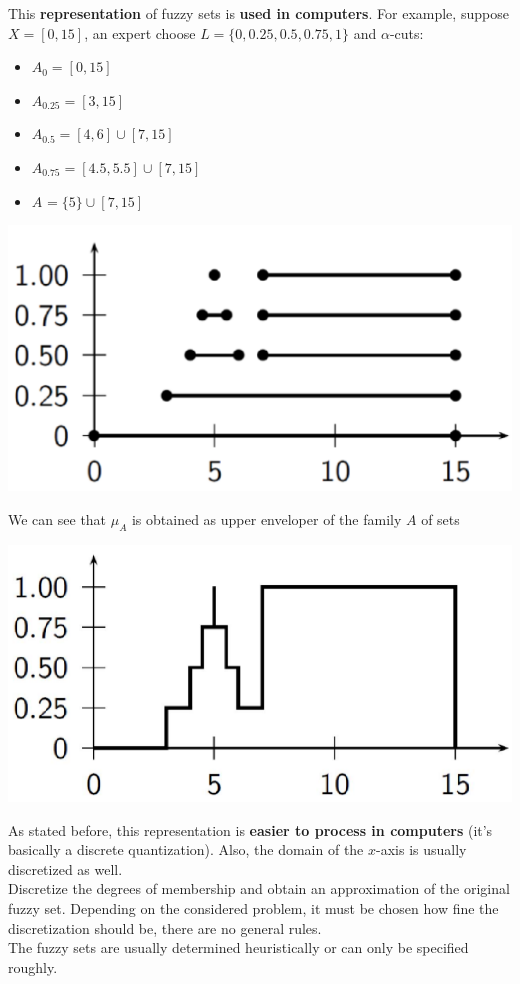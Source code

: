 \documentclass[11pt]{article}
\begin{document}
		This \textbf{representation} of fuzzy sets is \textbf{used in computers}. For example, suppose $X = [0, 15]$, an expert choose $L = \{0, 0.25, 0.5, 0.75, 1\}$ and $\alpha$-cuts:
		\begin{itemize}
			\item $A_0 = [0,15]$
			\item $A_{0.25} = [3,15]$
			\item $A_{0.5} = [4,6] \cup [7,15]$
			\item $A_{0.75} = [4.5,5.5] \cup [7, 15]$
			\item $A_{} = \{5\} \cup [7,15]$
		\end{itemize}
		\begin{center}
			\includegraphics[width=0.55\columnwidth]{img/FS/hr2}
		\end{center}
		
		\newpage
		
		We can see that $\mu_A$ is obtained as upper enveloper of the family $A$ of sets
		\begin{center}
			\includegraphics[width=0.55\columnwidth]{img/FS/hr3}
		\end{center}
		As stated before, this representation is \textbf{easier to process in computers} (it's basically a discrete quantization). Also, the domain of the $x$-axis is usually discretized as well.\\
		
		Discretize the degrees of membership and obtain an approximation of the original fuzzy set. Depending on the considered problem, it must be chosen how fine the discretization should be, there are no general rules.\\
		The fuzzy sets are usually determined heuristically or can only be specified roughly.\\
		
\end{document}
